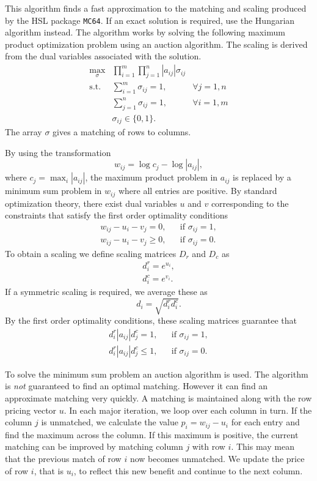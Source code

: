 This algorithm finds a fast approximation to the matching and scaling produced
by the HSL package \texttt{MC64}. If an exact solution is required, use the
Hungarian algorithm instead. The algorithm works by solving the following
maximum product optimization problem using an auction algorithm. The scaling
is derived from the dual variables associated with the solution.
\begin{eqnarray*}
   \max_{\sigma} & \prod_{i=1}^m\prod_{j=1}^n |a_{ij}|\sigma_{ij} & \\
   \mathrm{s.t.} & \sum_{i=1}^m\sigma_{ij} = 1, & \forall j=1,n \\
                 & \sum_{j=1}^n\sigma_{ij} = 1, & \forall i=1,m \\
                 & \sigma_{ij} \in \{0,1\}.
\end{eqnarray*}
The array $\sigma$ gives a matching of rows to columns.

By using the transformation
$$
   w_{ij} = \log c_j - \log |a_{ij}|,
$$
where $c_j = \max_i |a_{ij}|$, the maximum product problem in $a_{ij}$ is
replaced by a minimum sum problem in $w_{ij}$ where all entries are positive.
By standard optimization theory, there exist dual variables $u$ and $v$
corresponding to the constraints that satisfy the first order optimality
conditions
\begin{eqnarray*}
   w_{ij} - u_i - v_j = 0, && \mbox{if } \sigma_{ij }=1, \\
   w_{ij} - u_i - v_j \ge 0, && \mbox{if } \sigma_{ij }=0.
\end{eqnarray*}
To obtain a scaling we define scaling matrices $D_r$ and $D_c$ as
\begin{eqnarray*}
   & d^r_i = e^{u_i}, & \\
   & d^c_i = e^{v_i}. &
\end{eqnarray*}
If a symmetric scaling is required, we average these as
$$
   d_i = \sqrt{d^r_id^c_i}.
$$
By the first order optimality conditions, these scaling matrices guarantee that
\begin{eqnarray*}
   d^r_i|a_{ij}|d^c_j = 1, && \mbox{if } \sigma_{ij}=1, \\
   d^r_i|a_{ij}|d^c_j \le 1, && \mbox{if } \sigma_{ij}=0.
\end{eqnarray*}

To solve the minimum sum problem an auction algorithm is used. The 
algorithm is \textit{not} guaranteed to find an optimal matching. However it
can find an approximate matching very quickly. A matching is maintained along
with the row pricing vector $u$.
In each major iteration, we loop over each column in turn. If the
column $j$ is unmatched, we calculate the value $p_i = w_{ij} - u_i$ for each
entry and find the maximum across the column. If this maximum is positive, the
current matching can be improved by matching column $j$ with row $i$. This may
mean that the previous match of row $i$ now becomes unmatched. We update the
price of row $i$, that is $u_i$, to reflect this new benefit and continue to the
next column.


